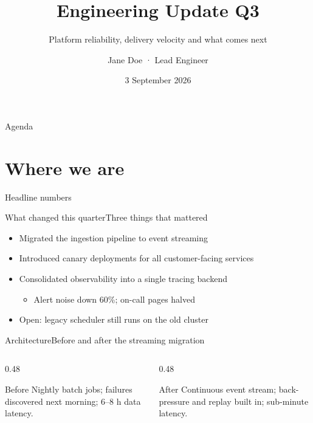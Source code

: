 \documentclass[aspectratio=169,t,11pt]{beamer}
\title{Engineering Update Q3}
\subtitle{Platform reliability, delivery velocity and what comes next}
\author{Jane Doe \textcolor{swissMuted}{·} Lead Engineer}
\institute{Example Corp}
\date{3 September 2026}
\begin{document}
\begin{frame}[plain]\titlepage\end{frame}

\begin{frame}{Agenda}
  \tableofcontents
\end{frame}

\section{Where we are}

\begin{frame}{Headline numbers}
  \vskip 0.8cm
  \hfill
  \hfill
\end{frame}

\begin{frame}{What changed this quarter}{Three things that mattered}
  \begin{itemize}
    \item Migrated the ingestion pipeline to event streaming
    \item Introduced canary deployments for all customer-facing services
    \item Consolidated observability into a single tracing backend
      \begin{itemize}
        \item Alert noise down 60\%; on-call pages halved
      \end{itemize}
    \item \alert{Open:} legacy scheduler still runs on the old cluster
  \end{itemize}
\end{frame}

\begin{frame}{Architecture}{Before and after the streaming migration}
  \begin{columns}[T]
    \begin{column}{0.48\textwidth}
      \begin{block}{Before}
        Nightly batch jobs; failures discovered next morning; 6–8 h data latency.
      \end{block}
    \end{column}
    \begin{column}{0.48\textwidth}
      \begin{block}{After}
        Continuous event stream; back-pressure and replay built in; sub-minute latency.
      \end{block}
    \end{column}
  \end{columns}
\end{frame}
\end{document}
